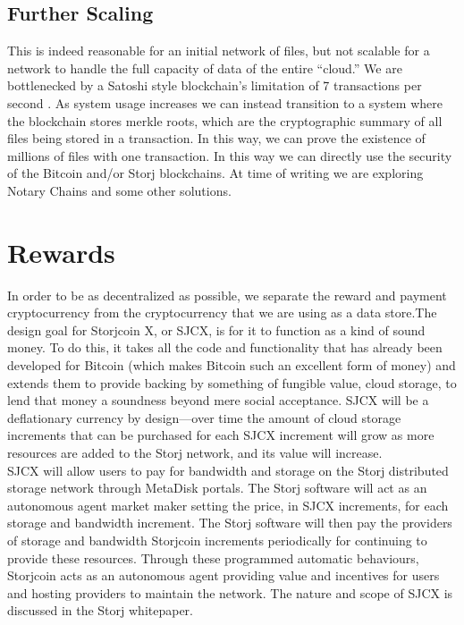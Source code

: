 \documentclass[a4paper,10pt]{article}
\begin{document}
\subsection{Further Scaling}

This is indeed reasonable for an initial network of files, but not scalable for a network to handle the full capacity of data of the entire “cloud.” We are bottlenecked by a Satoshi style blockchain’s limitation of 7 transactions per second \cite{13}. As system usage increases we can instead transition to a system where the blockchain stores merkle roots, which are the cryptographic summary of all files being stored in a transaction. In this way, we can prove the existence of millions of files with one transaction. In this way we can directly use the security of the Bitcoin and/or Storj blockchains. At time of writing we are exploring Notary Chains \cite{14} and some other solutions. 

\section{Rewards}

In order to be as decentralized as possible, we separate the reward and payment cryptocurrency from the cryptocurrency that we are using as a data store.The design goal for Storjcoin X, or SJCX, is for it to function as a kind of sound money. To do this, it takes all the code and functionality that has already been developed for Bitcoin (which makes Bitcoin such an excellent form of money) and extends them to provide backing by something of fungible value, cloud storage, to lend that money a soundness beyond mere social acceptance. SJCX will be a deflationary currency by design—over time the amount of cloud storage increments that can be purchased for each SJCX increment will grow as more resources are added to the Storj network, and its value will increase.\\

SJCX will allow users to pay for bandwidth and storage on the Storj distributed storage network through MetaDisk portals. The Storj software will act as an autonomous agent market maker setting the price, in SJCX increments, for each storage and bandwidth increment. The Storj software will then pay the providers of storage and bandwidth Storjcoin increments periodically for continuing to provide these resources. Through these programmed automatic behaviours, Storjcoin acts as an autonomous agent providing value and incentives for users and hosting providers to maintain the network. The nature and scope of SJCX is discussed in the Storj whitepaper.
\end{document}
